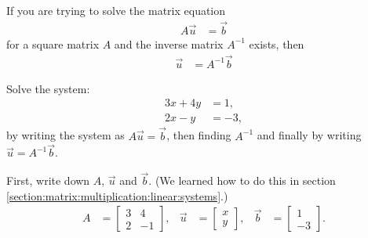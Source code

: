\begin{Boxed*}
If you are trying to solve the matrix equation
\begin{align*}
 A\vec{u} & = \vec{b}
\end{align*}
for a square matrix $A$ and the inverse matrix $A^{-1}$ exists, then
%
\begin{align*}
\vec{u} & = A^{-1} \vec{b}
\end{align*}
\end{Boxed*}


\begin{example}  \label{ex:solve:by:inverse}
Solve the system:
%
\begin{align*}
3x + 4y & = 1, \\
2x - y & = -3,
\end{align*}
by writing the system as $A \vec{u} = \vec{b}$, then finding $A^{-1}$ and finally by writing $\vec{u}  = A^{-1} \vec{b}$.

\solution

First, write down $A$, $\vec{u}$ and $\vec{b}$.  (We learned how to do this in section \ref{section:matrix:multiplication:linear:systems}.)
\begin{align*}
A & = \begin{bmatrix}
3 & 4 \\ 2 & -1
\end{bmatrix},
& \vec{u} &=
\begin{bmatrix}
	x \\ y
\end{bmatrix}, & \vec{b} & =
\begin{bmatrix}
	1 \\ -3
\end{bmatrix}.
\end{align*}


\end{example}

